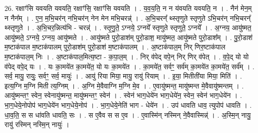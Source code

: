 \documentclass[17pt]{extarticle}
\begin{document}
26. रक्षाꣳ॑सि यवयति यवयति॒ रक्षाꣳ॑सि॒ रक्षाꣳ॑सि यवयति । . य॒व॒य॒ति॒ न न य॑वयति यवयति॒ न । . नैन॑ मेन॒म् न नैन᳚म् । . ए॒न॒ म॒भि॒चर॑न् नभि॒चर॑न् नेन मेन मभि॒चरन्न्॑ । . अ॒भि॒चरन्᳚ थ्स्तृणुते स्तृणुते ऽभि॒चर॑न् नभि॒चरन्᳚ थ्स्तृणुते । . अ॒भि॒चर॒न्नित्य॑भि - चरन्न्॑ । . स्तृ॒णु॒ते॒ ऽग्नये॒ ऽग्नये᳚ स्तृणुते स्तृणुते॒ ऽग्नये᳚ । . अ॒ग्नय॒ आयु॑ष्मत॒ आयु॑ष्मते॒ ऽग्नये॒ ऽग्नय॒ आयु॑ष्मते । . आयु॑ष्मते पुरो॒डाश॑म् पुरो॒डाश॒ मायु॑ष्मत॒ आयु॑ष्मते पुरो॒डाश᳚म् । . पु॒रो॒डाश॑ म॒ष्टाक॑पाल म॒ष्टाक॑पालम् पुरो॒डाश॑म् पुरो॒डाश॑ म॒ष्टाक॑पालम् । . अ॒ष्टाक॑पाल॒म् निर् णिर॒ष्टाक॑पाल म॒ष्टाक॑पाल॒म् निः । . अ॒ष्टाक॑पाल॒मित्य॒ष्टा - क॒पा॒ल॒म् । . निर् व॑पेद् वपे॒न् निर् णिर् व॑पेत् । . व॒पे॒द् यो यो व॑पेद् वपे॒द् यः । . यः का॒मये॑त का॒मये॑त॒ यो यः का॒मये॑त । . का॒मये॑त॒ सर्वꣳ॒॒ सर्व॑म् का॒मये॑त का॒मये॑त॒ सर्व᳚म् । . सर्व॒ मायु॒ रायुः॒ सर्वꣳ॒॒ सर्व॒ मायुः॑ । . आयु॑ रिया मिया॒ मायु॒ रायु॑ रियाम् । . इ॒या॒ मितीती॑या मिया॒ मिति॑ । . इत्य॒ग्नि म॒ग्नि मिती त्य॒ग्निम् । . अ॒ग्नि मे॒वैवाग्नि म॒ग्नि मे॒व । . ए॒वायु॑ष्मन्त॒ मायु॑ष्मन्त मे॒वैवायु॑ष्मन्तम् । . आयु॑ष्मन्तꣳ॒॒ स्वेन॒ स्वेनायु॑ष्मन्त॒ मायु॑ष्मन्तꣳ॒॒ स्वेन॑ । . स्वेन॑ भाग॒धेये॑न भाग॒धेये॑न॒ स्वेन॒ स्वेन॑ भाग॒धेये॑न । . भा॒ग॒धेये॒नोपोप॑ भाग॒धेये॑न भाग॒धेये॒नोप॑ । . भा॒ग॒धेये॒नेति॑ भाग - धेये॑न । . उप॑ धावति धाव॒ त्युपोप॑ धावति । . धा॒व॒ति॒ स स धा॑वति धावति॒ सः । . स ए॒वैव स स ए॒व । . ए॒वास्मि॑न् नस्मिन् ने॒वैवास्मिन्न्॑ । . अ॒स्मि॒न् नायु॒ रायु॑ रस्मिन् नस्मि॒न् नायुः॑ । \newline
\end{document}
